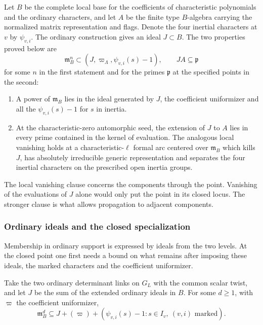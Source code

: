 Let \(B\) be the complete local base for the coefficients of
characteristic polynomials and the ordinary characters, and
let \(A\) be the finite type \(B\)-algebra carrying the
normalized matrix representation and flags. Denote the four
inertial characters at \(v\) by \(\psi_{v,i}\).
The ordinary construction gives an ideal \(J\subset B\).
The two properties proved below are
\[
 \mathfrak m_B^n\subset(J,\varpi_\Lambda,\psi_{v,i}(s)-1),\qquad
 JA\subseteq\mathfrak p
\]
for some \(n\) in the first statement and for the primes
\(\mathfrak p\) at the specified points in the second:

\begin{enumerate}
\item A power of \(\mathfrak m_B\) lies in the ideal generated
by \(J\), the coefficient uniformizer and all the
\(\psi_{v,i}(s)-1\) for \(s\) in inertia.
\item At the characteristic-zero automorphic seed, the
extension of \(J\) to \(A\) lies in every prime contained in
the kernel of evaluation. The analogous local vanishing holds
at a characteristic-\(\ell\) formal arc centered over
\(\mathfrak m_B\) which kills \(J\), has absolutely irreducible
generic representation and separates the four inertial
characters on the prescribed open inertia groups.
\end{enumerate}
The local vanishing clause concerns the components through the
point. Vanishing of the evaluations of \(J\) alone would only
put the point in its closed locus. The stronger clause is what
allows propagation to adjacent components.
\label{cor:ordinary-promodularity-1}

\subsubsection{Ordinary ideals and the closed specialization}
\label{par:count-two-ideals}

Membership in ordinary support is expressed by ideals from the two levels. At the closed point one first needs a bound on what remains after imposing these ideals, the marked characters and the coefficient uniformizer.

\begin{proposition}\label{prop:tower-closed-specialization}
Take the two ordinary determinant links on \(G_L\) with the common
scalar twist, and let \(J\) be the sum of the extended ordinary
ideals in \(B\). For some \(d\ge1\), with \(\varpi\) the coefficient uniformizer, 
\[
 \mathfrak m_B^d\subseteq J+(\varpi)+(\psi_{v,i}(s)-1:s\in I_v,\ (v,i)\text{ marked}).
\]

\end{proposition}

